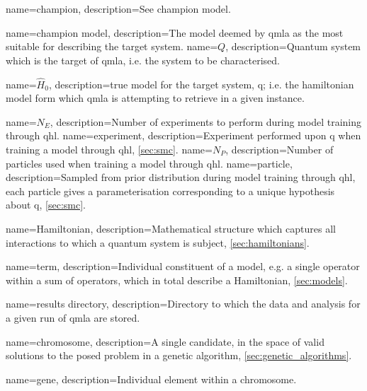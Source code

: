 {
    name=champion,
    description={See \gls{champion model}.}
}

{
    name=champion model,
    description={The model deemed by \acrshort{qmla} as the most suitable for describing the target system.}
}
{
    name=$Q$,
    description={Quantum system which is the target of \acrshort{qmla}, i.e. the system to be characterised.}
}

{
    name=$\hat{H}_0$,
    description={\Gls{true model} for the target system, \gls{q}; 
        i.e. the \gls{hamiltonian} \gls{model} form which \acrshort{qmla} is attempting to retrieve in a given \gls{instance}.
    }
}

{
    name=$N_E$,
    description={Number of \glspl{experiment} to perform during model training through \acrshort{qhl}.}
}
{
    name=experiment,
    description={Experiment performed upon \gls{q} when training a model through \acrshort{qhl}, \cref{sec:smc}.}
}
{
    name=$N_P$,
    description={Number of \glspl{particle} used when training a \gls{model} through \acrshort{qhl}.}
}
{
    name=particle,
    description={Sampled from prior distribution during model training through \acrshort{qhl}, each particle gives a parameterisation corresponding to a unique 
    hypothesis about \gls{q}, \cref{sec:smc}.
    }
}

{
    name=Hamiltonian,
    description={Mathematical structure which captures all interactions to which a quantum system is subject, \cref{sec:hamiltonians}.}
}


{
    name=term,
    description={Individual constituent of a model, 
    e.g. a single operator within a sum of operators, which in total describe a Hamiltonian, \cref{sec:models}.
    }
}

{
    name={results directory},
    description={Directory to which the data and analysis for a given \gls{run} of \acrshort{qmla} are stored.
    }
}

{
    name=chromosome,
    description={A single candidate, in the space of valid solutions to the posed problem in a genetic algorithm, \cref{sec:genetic_algorithms}.
    }
}

{
    name=gene,
    description={Individual element within a \gls{chromosome}.
    }
}


\RestoreAcronyms
\makeglossaries
\preto\chapter{\glsresetall}
